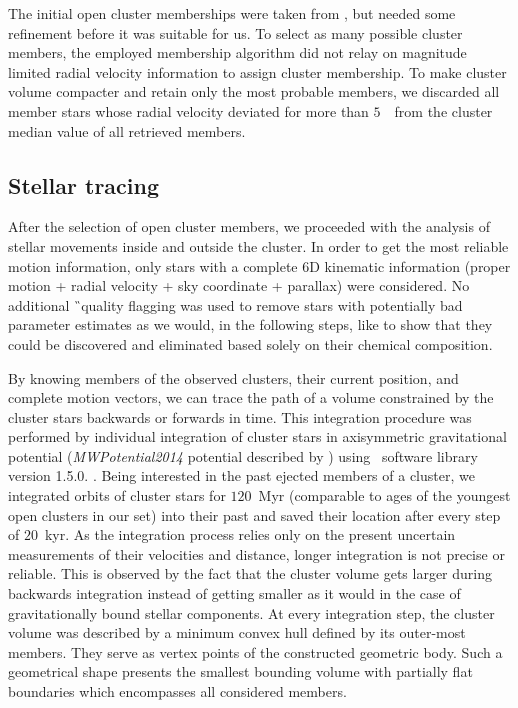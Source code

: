 The initial open cluster memberships were taken from \citet{2018A&A...618A..93C}, but needed some refinement before it was suitable for us. To select as many possible cluster members, the employed membership algorithm did not relay on magnitude limited radial velocity information to assign cluster membership. To make cluster volume compacter and retain only the most probable members, we discarded all member stars whose radial velocity deviated for more than $5$~\kms\ from the cluster median value of all retrieved members.

\subsection{Stellar tracing}
\label{sec:orbit_tracing}
After the selection of open cluster members, we proceeded with the analysis of stellar movements inside and outside the cluster. In order to get the most reliable motion information, only stars with a complete 6D kinematic information (proper motion + radial velocity + sky coordinate + parallax) were considered. No additional \G\ quality flagging was used to remove stars with potentially bad parameter estimates as we would, in the following steps, like to show that they could be discovered and eliminated based solely on their chemical composition.

By knowing members of the observed clusters, their current position, and complete motion vectors, we can trace the path of a volume constrained by the cluster stars backwards or forwards in time. This integration procedure was performed by individual integration of cluster stars in axisymmetric gravitational potential (\textit{MWPotential2014} potential described by \citet{2015ApJS..216...29B}) using \GP\ software library version 1.5.0. \cite{2015ApJS..216...29B}. Being interested in the past ejected members of a cluster, we integrated orbits of cluster stars for $120$~Myr (comparable to ages of the youngest open clusters in our set) into their past and saved their location after every step of $20$~kyr. As the integration process relies only on the present uncertain measurements of their velocities and distance, longer integration is not precise or reliable. This is observed by the fact that the cluster volume gets larger during backwards integration instead of getting smaller as it would in the case of gravitationally bound stellar components. At every integration step, the cluster volume was described by a minimum convex hull defined by its outer-most members. They serve as vertex points of the constructed geometric body. Such a geometrical shape presents the smallest bounding volume with partially flat boundaries which encompasses all considered members.


